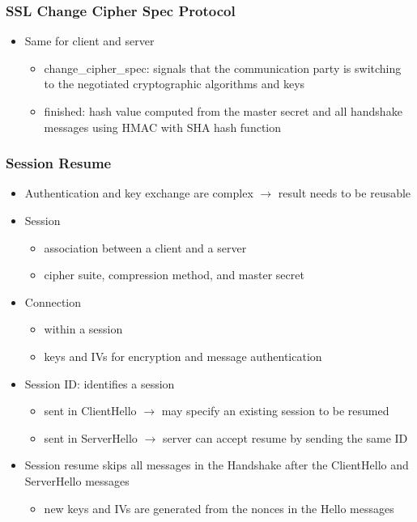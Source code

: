 \documentclass[final]{article}
\begin{document}
\subsubsection*{SSL Change Cipher Spec Protocol}
\begin{itemize}[nosep]
    \item Same for client and server
          \begin{itemize}[nosep]
              \item change\_cipher\_spec: signals that the communication party is switching to the negotiated cryptographic algorithms and keys
              \item finished: hash value computed from the master secret and all handshake messages using HMAC with SHA hash function
          \end{itemize}
\end{itemize}
\subsubsection*{Session Resume}
\begin{itemize}
    \item Authentication and key exchange are complex $\rightarrow$ result needs to be reusable
    \item Session
          \begin{itemize}[nosep]
              \item association between a client and a server
              \item cipher suite, compression method, and master secret
          \end{itemize}
    \item Connection
          \begin{itemize}[nosep]
              \item within a session
              \item keys and IVs for encryption and message authentication
          \end{itemize}
    \item Session ID: identifies a session
          \begin{itemize}[nosep]
              \item sent in ClientHello $\rightarrow$ may specify an existing session to be resumed
              \item sent in ServerHello $\rightarrow$ server can accept resume by sending the same ID
          \end{itemize}
    \item Session resume skips all messages in the Handshake after the ClientHello and ServerHello messages
          \begin{itemize}[nosep]
              \item new keys and IVs are generated from the nonces in the Hello messages
          \end{itemize}
\end{itemize}
\end{document}
